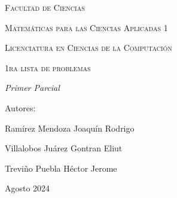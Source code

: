 \documentclass{book}
\begin{document}
\begin{titlepage}
        \vspace{1cm}
        {\scshape\Large Facultad de Ciencias \par}
        \vspace{1cm}
        {\scshape\Large Matemáticas para las Ciencias Aplicadas 1 \par}
        \vspace{1cm}
        {\scshape\Large Licenciatura en Ciencias de la Computación \par}
        \vspace{1cm}
        {\scshape\Huge 1ra lista de problemas  \par}
        \vspace{3cm}
        {\itshape\Large Primer Parcial \par}
        \vfill
        {\Large Autores: \par}
        {\Large Ramírez Mendoza Joaquín Rodrigo \par}
        {\Large Villalobos Juárez Gontran Eliut\par}
        {\Large Treviño Puebla Héctor Jerome \par}
        \vfill
        {\Large Agosto 2024 \par}
    \end{titlepage}
    \maketitle






\end{document}
